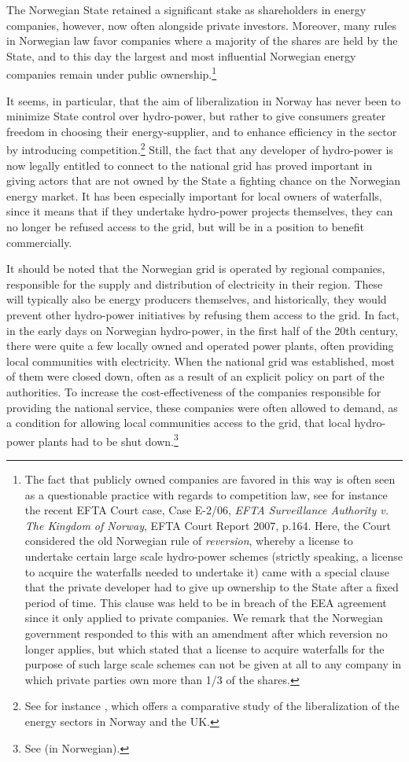 The Norwegian State retained a significant stake as shareholders in energy companies, however, now often alongside private investors. Moreover, many rules in Norwegian law favor companies where a majority of the shares are held by the State, and to this day the largest and most influential Norwegian energy companies remain under public ownership.\footnote{The fact that publicly owned companies are favored in this way is often seen as a questionable practice with regards to competition law, see for instance the recent EFTA Court case, Case E-2/06, \emph{EFTA Surveillance Authority v. The Kingdom of Norway}, EFTA Court Report 2007, p.164. Here, the Court considered the old Norwegian rule of \emph{reversion}, whereby a license to undertake certain large scale hydro-power schemes (strictly speaking, a license to acquire the waterfalls needed to undertake it) came with a special clause that the private developer had to give up ownership to the State after a fixed period of time. This clause was held to be in breach of the EEA agreement since it only applied to private companies. We remark that the Norwegian government responded to this with an amendment after which reversion no longer applies, but which stated that a license to acquire waterfalls for the purpose of such large scale schemes can not be given at all to any company in which private parties own more than 1/3 of the shares.}

It seems, in particular, that the aim of liberalization in Norway has never been to minimize State control over hydro-power, but rather to give consumers greater freedom in choosing their energy-supplier, and to enhance efficiency in the sector by introducing competition.\footnote{See for instance \cite{liberal}, which offers a comparative study of the liberalization of the energy sectors in Norway and the UK.} Still, the fact that any developer of hydro-power is now legally entitled to connect to the national grid has proved important in giving actors that are not owned by the State a fighting chance on the Norwegian energy market. It has been especially important for local owners of waterfalls, since it means that if they undertake hydro-power projects themselves, they can no longer be refused access to the grid, but will be in a position to benefit commercially.

It should be noted that the Norwegian grid is operated by regional companies, responsible for the supply and distribution of electricity in their region. These will typically also be energy producers themselves, and historically, they would prevent other hydro-power initiatives by refusing them access to the grid. In fact, in the early days on Norwegian hydro-power, in the first half of the 20th century, there were quite a few locally owned and operated power plants, often providing local communities with electricity. When the national grid was established, most of them were closed down, often as a result of an explicit policy on part of the authorities. To increase the cost-effectiveness of the companies responsible for providing the national service, these companies were often allowed to demand, as a condition for allowing local communities access to the grid, that local hydro-power plants had to be shut down.\footnote{See \cite[p.111]{Hindrum} (in Norwegian).}

